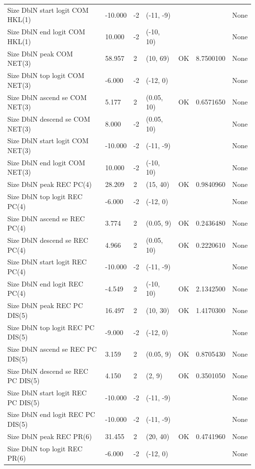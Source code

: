 \documentclass[11pt,
  english,
]{article}
\begin{document}
\begin{landscape}
\begin{longtable}[t]{lllllll}
Size DblN start logit COM HKL(1) & -10.000 & -2 & (-11, -9) &  &  & None\\
Size DblN end logit COM HKL(1) & 10.000 & -2 & (-10, 10) &  &  & None\\
Size DblN peak COM NET(3) & 58.957 & 2 & (10, 69) & OK & 8.7500100 & None\\
\addlinespace
Size DblN top logit COM NET(3) & -6.000 & -2 & (-12, 0) &  &  & None\\
Size DblN ascend se COM NET(3) & 5.177 & 2 & (0.05, 10) & OK & 0.6571650 & None\\
Size DblN descend se COM NET(3) & 8.000 & -2 & (0.05, 10) &  &  & None\\
Size DblN start logit COM NET(3) & -10.000 & -2 & (-11, -9) &  &  & None\\
Size DblN end logit COM NET(3) & 10.000 & -2 & (-10, 10) &  &  & None\\
\addlinespace
Size DblN peak REC PC(4) & 28.209 & 2 & (15, 40) & OK & 0.9840960 & None\\
Size DblN top logit REC PC(4) & -6.000 & -2 & (-12, 0) &  &  & None\\
Size DblN ascend se REC PC(4) & 3.774 & 2 & (0.05, 9) & OK & 0.2436480 & None\\
Size DblN descend se REC PC(4) & 4.966 & 2 & (0.05, 10) & OK & 0.2220610 & None\\
Size DblN start logit REC PC(4) & -10.000 & -2 & (-11, -9) &  &  & None\\
\addlinespace
Size DblN end logit REC PC(4) & -4.549 & 2 & (-10, 10) & OK & 2.1342500 & None\\
Size DblN peak REC PC DIS(5) & 16.497 & 2 & (10, 30) & OK & 1.4170300 & None\\
Size DblN top logit REC PC DIS(5) & -9.000 & -2 & (-12, 0) &  &  & None\\
Size DblN ascend se REC PC DIS(5) & 3.159 & 2 & (0.05, 9) & OK & 0.8705430 & None\\
Size DblN descend se REC PC DIS(5) & 4.150 & 2 & (2, 9) & OK & 0.3501050 & None\\
\addlinespace
Size DblN start logit REC PC DIS(5) & -10.000 & -2 & (-11, -9) &  &  & None\\
Size DblN end logit REC PC DIS(5) & -10.000 & -2 & (-11, -9) &  &  & None\\
Size DblN peak REC PR(6) & 31.455 & 2 & (20, 40) & OK & 0.4741960 & None\\
Size DblN top logit REC PR(6) & -6.000 & -2 & (-12, 0) &  &  & None\\

\end{longtable}
\end{landscape}
\end{document}
